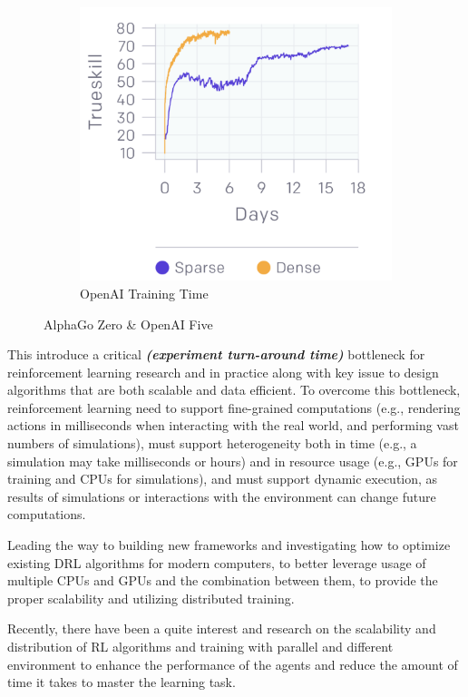 \begin{figure}[H]
\begin{subfigure}[b]{0.3\textwidth}
		\includegraphics[width=\textwidth]{figures/rl/openai_five_time.png}
        \caption{OpenAI Training Time}
		\label{fig:rl_2}
	\end{subfigure}
	\hfill
	   \caption{AlphaGo Zero \& OpenAI Five}
	   \label{fig:zero_and_five}
\end{figure}

This introduce a critical \textit{\textbf{(experiment turn-around time)}} bottleneck for reinforcement learning research and in practice along with key issue to design algorithms that are both scalable and data efficient. To overcome this bottleneck, reinforcement learning need to support fine-grained computations (e.g., rendering actions in milliseconds when interacting with the real world, and performing vast numbers of simulations), must support heterogeneity both in time (e.g., a simulation may take milliseconds or hours) and in resource usage (e.g., GPUs for training and CPUs for simulations), and must support dynamic execution, as results of simulations or interactions with the environment can change future computations. 

Leading the way to building new frameworks and investigating how to optimize existing DRL algorithms for modern computers, to better leverage usage of multiple CPUs and GPUs and the combination between them, to provide the proper scalability and utilizing distributed training.

Recently, there have been a quite interest and research on the scalability and distribution of RL algorithms and training with parallel and different environment to enhance the performance of the agents and reduce the amount of time it takes to master the learning task.


